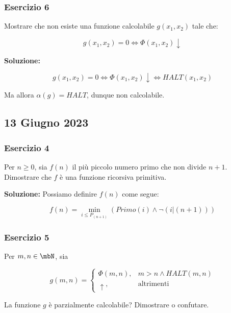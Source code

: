 \subsubsection{Esercizio 6}

Mostrare che non esiste una funzione calcolabile \(g(x_1,x_2)\) tale che:

\begin{equation}
  g(x_1,x_2) = 0 \iff \Phi(x_1,x_2) \downarrow
\end{equation}

\textbf{Soluzione: }

\begin{equation}
  g(x_1,x_2) = 0 \iff \Phi(x_1,x_2) \downarrow \iff HALT(x_1,x_2)
\end{equation}

Ma allora \(\alpha(g)=HALT\), dunque non calcolabile.

\subsection{13 Giugno 2023}

\subsubsection{Esercizio 4}

Per \(n \geq 0\), sia \(f(n)\) il più piccolo numero primo che non divide \(n+1\). Dimostrare che \(f\) è una funzione ricorsiva primitiva.

\textbf{Soluzione: } Possiamo definire \(f(n)\) come segue:

\begin{equation}
  f(n) = \min_{i \leq P_{(n+1)}} (Primo(i) \land \neg (i \vert (n+1)))
\end{equation}

\subsubsection{Esercizio 5}

Per \(m,n \in \mbN\), sia

\begin{equation}
  g(m,n)=\begin{cases}
    \Phi(m,n), & m>n \land HALT(m,n)\\
    \uparrow, & \text{altrimenti}
  \end{cases}
\end{equation}

La funzione \(g\) è parzialmente calcolabile? Dimostrare o confutare.


